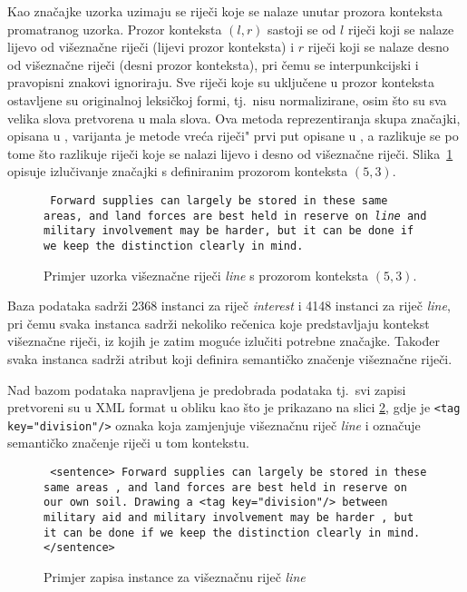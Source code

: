 \documentclass[10pt, a4paper]{article}
\begin{document}
Kao značajke uzorka uzimaju se riječi koje se nalaze unutar prozora konteksta promatranog uzorka.
Prozor konteksta $(l,r)$  sastoji se
od $l$ riječi koji se nalaze lijevo od višeznačne riječi (lijevi prozor konteksta) 
i $r$ riječi koji se nalaze desno od višeznačne riječi (desni prozor konteksta), pri čemu se
interpunkcijski i pravopisni znakovi ignoriraju. Sve riječi koje su uključene u prozor konteksta ostavljene su originalnoj leksičkoj formi, tj.~nisu normalizirane, osim što su sva velika
slova pretvorena u mala slova. 
Ova metoda reprezentiranja skupa značajki,
opisana u \citep{pedersen}, varijanta je metode \glqq vreća riječi"  
prvi put opisane u \citep{gale-etc}, a razlikuje se po tome što razlikuje 
riječi koje se nalazi lijevo i desno od višeznačne riječi. \mbox{Slika \ref{window_of_context}}
opisuje izlučivanje značajki s definiranim prozorom konteksta $(5,3)$.

\begin{figure}[!hbtp]
{\small \texttt{     Forward supplies can largely be stored in these same areas, and land forces are best held in reserve on  \emph{line}  and military involvement may be harder, but it can be done if we keep the distinction clearly in mind.}}
\caption{Primjer uzorka višeznačne riječi \emph{line} s prozorom konteksta $(5, 3)$.\label{window_of_context}}
\end{figure}

Baza podataka sadrži 2368 instanci za riječ \emph{interest} i 4148 instanci za riječ \emph{line}, 
pri čemu svaka instanca sadrži nekoliko rečenica koje predstavljaju kontekst višeznačne riječi,
iz kojih je zatim moguće izlučiti potrebne značajke. Također svaka instanca sadrži atribut koji 
definira semantičko značenje višeznačne riječi.

Nad bazom podataka napravljena je predobrada podataka tj.~svi zapisi pretvoreni su u XML format
u obliku kao što je prikazano na slici \ref{fig:instance_example}, gdje je \texttt{<tag key="division"/>}
oznaka koja zamjenjuje višeznačnu riječ \emph{line} i označuje semantičko značenje riječi u tom kontekstu.

\begin{figure}[!hbtp]
{\small \texttt{
<sentence>
Forward supplies can largely be stored in these same areas , and land forces are best held in reserve on our own soil. Drawing a  <tag key="division"/>  between military aid and military involvement may be harder , but it can be done if we keep the distinction clearly in mind.
</sentence>}}
\caption{Primjer zapisa instance za višeznačnu riječ \emph{line}
\label{fig:instance_example}}
\end{figure}
\end{document}
